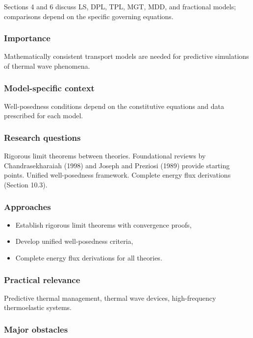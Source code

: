 Sections 4 and 6 discuss LS, DPL, TPL, MGT, MDD, and fractional models; comparisons depend on the specific governing equations.

\subsubsection{Importance}

Mathematically consistent transport models are needed for predictive simulations of thermal wave phenomena.

\subsubsection{Model-specific context}

Well-posedness conditions depend on the constitutive equations and data prescribed for each model.

\subsubsection{Research questions}

Rigorous limit theorems between theories. Foundational reviews by Chandrasekharaiah (1998) \cite{Chandrasekharaiah1998} and Joseph and Preziosi (1989) \cite{Joseph1989} provide starting points. Unified well-posedness framework. Complete energy flux derivations (Section 10.3).

\subsubsection{Approaches}

\begin{itemize}
\item Establish rigorous limit theorems with convergence proofs,
\item Develop unified well-posedness criteria,
\item Complete energy flux derivations for all theories.
\end{itemize}

\subsubsection{Practical relevance}

Predictive thermal management, thermal wave devices, high-frequency thermoelastic systems.

\subsubsection{Major obstacles}

